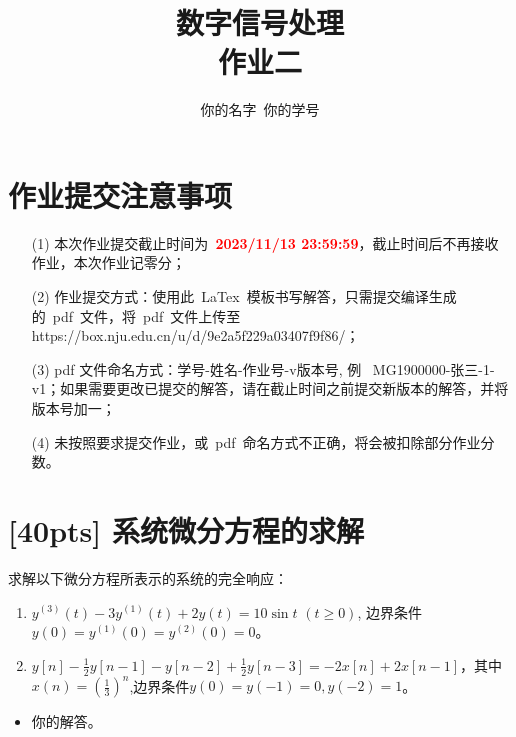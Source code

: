 \documentclass[a4paper,UTF8]{article}
\numberwithin{equation}{section}
\begin{document}
\title{数字信号处理\\
作业二}
\author{你的名字\, 你的学号} 
\maketitle

\section*{作业提交注意事项}
\begin{tcolorbox}
    \begin{enumerate}
        \item[(1)] 本次作业提交截止时间为~\textcolor{red}{\textbf{2023/11/13  23:59:59}}，截止时间后不再接收作业，本次作业记零分；
        \item[(2)] 作业提交方式：使用此~LaTex~模板书写解答，只需提交编译生成的~pdf~文件，将~pdf~文件上传至https://box.nju.edu.cn/u/d/9e2a5f229a03407f9f86/；
        \item[(3)] pdf 文件命名方式：学号-姓名-作业号-v版本号, 例~ MG1900000-张三-1-v1；如果需要更改已提交的解答，请在截止时间之前提交新版本的解答，并将版本号加一；
        \item[(4)] 未按照要求提交作业，或~pdf~命名方式不正确，将会被扣除部分作业分数。

    \end{enumerate}
\end{tcolorbox}


\newpage
\section{[40pts] 系统微分方程的求解 }
求解以下微分方程所表示的系统的完全响应：
\begin{enumerate}[(1)]
    \item $y^{(3)}(t)-3y^{(1)}(t)+2y(t)=10\sin t$ $(t\geqslant0)$, 边界条件$y(0)=y^{(1)}(0)=y^{(2)}(0)=0$。
    \item $y[n]-\displaystyle\frac{1}{2}y[n-1]-y[n-2]+\frac{1}{2}y[n-3]=-2x[n]+2x[n-1]$，其中$x(n)=\displaystyle\left(\frac{1}{3}\right)^n$,边界条件$y(0)=y(-1)=0,y(-2)=1$。
\end{enumerate}

\begin{framed}
    \begin{spacing}{1.5}
        \begin{itemize}
            \item 你的解答。
        \end{itemize}
    \end{spacing}
\end{framed}
\end{document}
